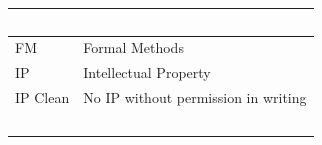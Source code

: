 \documentclass{template/openetcs_article}
\begin{document}
\begin{flushleft}
\begin{supertabular}{|m{2cm}|m{12cm}|}
~
\\\hline
FM &
Formal Methods\\\hline
IP &
Intellectual Property\\\hline
IP Clean &
No IP without permission in writing \\\hline
~
 &
~
\\\hline
\end{supertabular}
\end{flushleft}

\bigskip


\bigskip

\clearpage
\bigskip
\end{document}
